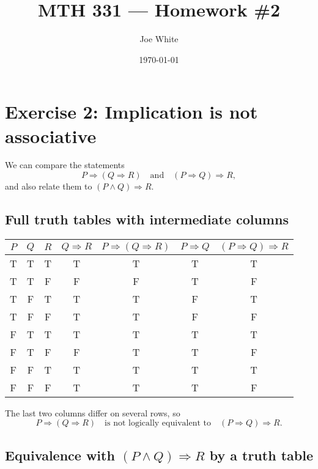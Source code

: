 \documentclass[11pt]{article}
\title{MTH 331 — Homework \#2}
\author{Joe White}
\date{\today}
\begin{document}
\maketitle

\section*{Exercise 2: Implication is not associative}

We can compare the statements
\[
P \Rightarrow (Q \Rightarrow R)
\quad\text{and}\quad
(P \Rightarrow Q) \Rightarrow R,
\]
and also relate them to $(P \land Q) \Rightarrow R$.

\subsection*{Full truth tables with intermediate columns}

\begin{center}
\renewcommand{\arraystretch}{1.15}
\begin{tabular}{|c|c|c||c|c||c|c|}
\hline
$P$ & $Q$ & $R$ & $Q\Rightarrow R$ & $P\Rightarrow(Q\Rightarrow R)$ & $P\Rightarrow Q$ & $(P\Rightarrow Q)\Rightarrow R$ \\
\hline
T & T & T & T & T & T & T \\
T & T & F & F & F & T & F \\
T & F & T & T & T & F & T \\
T & F & F & T & T & F & F \\
F & T & T & T & T & T & T \\
F & T & F & F & T & T & F \\
F & F & T & T & T & T & T \\
F & F & F & T & T & T & F \\
\hline
\end{tabular}
\end{center}

The last two columns differ on several rows, so
\[
P \Rightarrow (Q \Rightarrow R) \quad\text{is not logically equivalent to}\quad (P \Rightarrow Q) \Rightarrow R.
\]

\subsection*{Equivalence with $(P \land Q) \Rightarrow R$ by a truth table}
\end{document}
